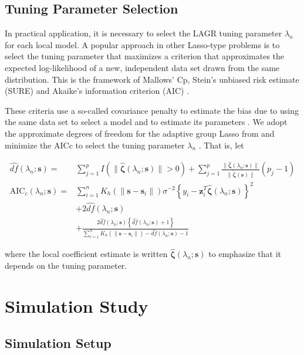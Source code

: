 \documentclass[authoryear,review, 12pt]{elsarticle}
\begin{document}
\subsection{Tuning Parameter Selection}

In practical application, it is necessary to select the LAGR tuning
parameter $\lambda_{n}$ for each local model. A popular approach
in other Lasso-type problems is to select the tuning parameter that
maximizes a criterion that approximates the expected log-likelihood
of a new, independent data set drawn from the same distribution. This
is the framework of Mallows' Cp, Stein's unbiased risk estimate (SURE)
and Akaike's information criterion (AIC) \citep{Mallows-1973,Stein-1981,Akaike-1973}.

These criteria use a so-called covariance penalty to estimate the
bias due to using the same data set to select a model and to estimate
its parameters \citep{Efron:2004a}. We adopt the approximate degrees
of freedom for the adaptive group Lasso from \citet{Yuan-Lin-2006}
and minimize the AICc to select the tuning parameter $\lambda_{n}$
\citep{Hurvich-1998}. That is, let

\begin{align*}
\hat{df}(\lambda_{n};\bm{s})= & \sum_{j=1}^{p}I\left(\|\hat{\bm{\zeta}}(\lambda_{n};\bm{s})\|>0\right)+\sum_{j=1}^{p}\frac{\|\hat{\bm{\zeta}}(\lambda_{n};\bm{s})\|}{\|\tilde{\bm{\zeta}}(\bm{s})\|}(p_{j}-1)\\
\text{AIC}_{c}(\lambda_{n};\bm{s})= & \sum_{i=1}^{n}K_{h}(\|\bm{s}-\bm{s}_{i}\|)\sigma^{-2}\left\{ y_{i}-\bm{z}_{i}^{T}\hat{\bm{\zeta}}(\lambda_{n};\bm{s})\right\} ^{2}\\
 & +2\hat{df}(\lambda_{n};\bm{s})\\
 & +\frac{2\hat{df}(\lambda_{n};\bm{s})\left\{ \hat{df}(\lambda_{n};\bm{s})+1\right\} }{\sum_{i=1}^{n}K_{h}(\|\bm{s}-\bm{s}_{i}\|)-\hat{df}(\lambda_{n};\bm{s})-1}
\end{align*}


where the local coefficient estimate is written $\hat{\bm{\zeta}}(\lambda_{n};\bm{s})$
to emphasize that it depends on the tuning parameter.


\section{Simulation Study\label{sec:simulations}}




\subsection{Simulation Setup}
\end{document}
